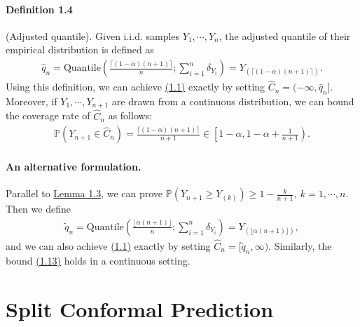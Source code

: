 \documentclass{article}
\numberwithin{equation}{section}
\begin{document}
\paragraph{Definition 1.4} (Adjusted quantile). Given i.i.d. samples $Y_1,\cdots,Y_n$, the adjusted quantile of their empirical distribution is defined as
\begin{align*}
	\widehat{q}_n = \mathrm{Quantile}\left(\frac{\lceil(1-\alpha)(n+1)\rceil}{n};\sum_{i=1}^n\delta_{Y_i}\right) = Y_{\left({\lceil(1-\alpha)(n+1)\rceil}\right)}.\tag{1.12}
\end{align*}
Using this definition, we can achieve \hyperref[1.1]{(1.1)} exactly by setting $\widehat{C}_n=(-\infty,\widehat{q}_n]$. Moreover, if $Y_1,\cdots,Y_{n+1}$ are drawn from a continuous distribution, we can bound the coverage rate of $\widehat{C}_n$ as follows:
\begin{align*}
	\mathbb{P}\left(Y_{n+1}\in\widehat{C}_n\right) = \frac{\lceil(1-\alpha)(n+1)\rceil}{n+1} \in\left[1-\alpha,1-\alpha + \frac{1}{n+1}\right).\tag{1.13}\label{1.13}
\end{align*}

\paragraph{An alternative formulation.} Parallel to \hyperref[Lemma 1.3]{Lemma 1.3}, we can prove $\mathbb{P}(Y_{n+1}\geq Y_{(k)})\geq 1-\frac{k}{n+1},\ k=1,\cdots,n$. Then we define
\begin{align*}
	\widetilde{q}_n = \mathrm{Quantile}\left(\frac{\lfloor \alpha(n+1)\rfloor}{n};\sum_{i=1}^n\delta_{Y_i}\right) = Y_{\left(\lfloor \alpha(n+1)\rfloor\right)},\tag{1.14}
\end{align*}
and we can also achieve \hyperref[1.1]{(1.1)} exactly by setting $\widehat{C}_n = [\widetilde{q}_n,\infty).$ Similarly, the bound \hyperref[1.13]{(1.13)} holds in a continuous setting.

\section{Split Conformal Prediction}
\end{document}
